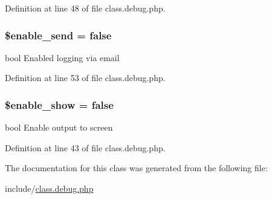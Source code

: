 Definition at line 48 of file class.\-debug.\-php.

\hypertarget{class_debug_aeb64a58109ab72544114d51e42a3ca4f}{
\subsubsection[{\$enable\-\_\-send}]{\setlength{\rightskip}{0pt plus 5cm}\$enable\-\_\-send = false\hspace{0.3cm}{\ttfamily [static]}}}\label{class_debug_aeb64a58109ab72544114d51e42a3ca4f}
bool Enabled logging via email 

Definition at line 53 of file class.\-debug.\-php.

\hypertarget{class_debug_a5789d2d16b0d24dc6aa96b63b4f6f605}{
\subsubsection[{\$enable\-\_\-show}]{\setlength{\rightskip}{0pt plus 5cm}\$enable\-\_\-show = false\hspace{0.3cm}{\ttfamily [static]}}}\label{class_debug_a5789d2d16b0d24dc6aa96b63b4f6f605}
bool Enable output to screen 

Definition at line 43 of file class.\-debug.\-php.



The documentation for this class was generated from the following file\-:\begin{DoxyCompactItemize}
\item 
include/\hyperlink{class_8debug_8php}{class.\-debug.\-php}\end{DoxyCompactItemize}
